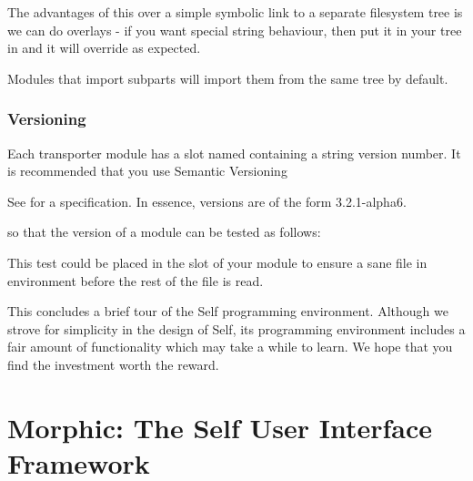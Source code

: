 \documentclass[letterpaper,10pt,english]{sphinxmanual}
\begin{document}
The advantages of this over a simple symbolic link to a separate filesystem tree is we can do overlays - if you want special string behaviour, then put it in your tree in  and it will override as expected.

Modules that import subparts will import them from the same tree by default.


\subsection{Versioning}
\label{\detokenize{howtoprg:versioning}}
Each transporter module has a slot named  containing a string version number. It is recommended that you use Semantic Versioning %
\begin{footnote}[10]\sphinxAtStartFootnote
See  for a specification. In essence, versions are of the form \sphinxquotedblleft{}3.2.1-alpha6\sphinxquotedblright{}.
%
\end{footnote} so that the version of a module can be tested as follows:

\begin{sphinxVerbatim}[commandchars=\\\{\}]
        
   \PYG{p}{[}  \PYG{p}{]}
\end{sphinxVerbatim}

This test could be placed in the  slot of your module to ensure a sane file in environment before the rest of the file is read.

This concludes a brief tour of the Self programming environment. Although we strove for simplicity
in the design of Self, its programming environment includes a fair amount of functionality
which may take a while to learn. We hope that you find the investment worth the reward.


\chapter{Morphic: The Self User Interface Framework}
\label{\detokenize{morphic::doc}}\label{\detokenize{morphic:morphic-the-self-user-interface-framework}}
\end{document}
